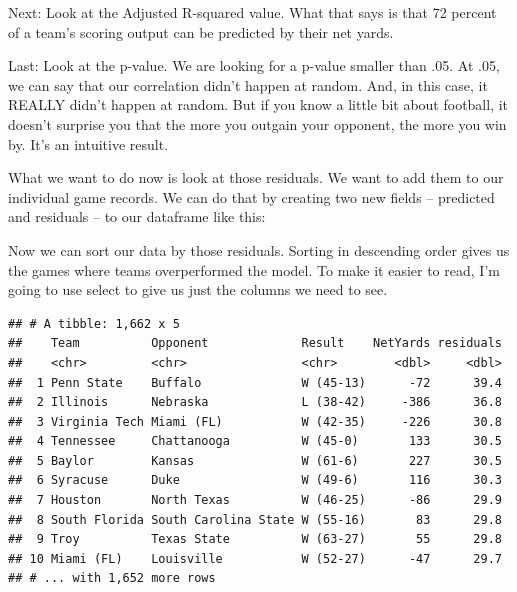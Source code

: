 \documentclass[
]{book}
\newenvironment{Shaded}{\begin{snugshade}}{\end{snugshade}}
\newcommand{\KeywordTok}[1]{\textcolor[rgb]{0.13,0.29,0.53}{\textbf{#1}}}
\newcommand{\NormalTok}[1]{#1}
\newcommand{\OperatorTok}[1]{\textcolor[rgb]{0.81,0.36,0.00}{\textbf{#1}}}
\newcommand{\StringTok}[1]{\textcolor[rgb]{0.31,0.60,0.02}{#1}}
\begin{document}
Next: Look at the Adjusted R-squared value. What that says is that 72 percent of a team's scoring output can be predicted by their net yards.

Last: Look at the p-value. We are looking for a p-value smaller than .05. At .05, we can say that our correlation didn't happen at random. And, in this case, it REALLY didn't happen at random. But if you know a little bit about football, it doesn't surprise you that the more you outgain your opponent, the more you win by. It's an intuitive result.

What we want to do now is look at those residuals. We want to add them to our individual game records. We can do that by creating two new fields -- predicted and residuals -- to our dataframe like this:

\begin{Shaded}
\end{Shaded}

Now we can sort our data by those residuals. Sorting in descending order gives us the games where teams overperformed the model. To make it easier to read, I'm going to use select to give us just the columns we need to see.

\begin{Shaded}
\end{Shaded}

\begin{verbatim}
## # A tibble: 1,662 x 5
##    Team          Opponent             Result    NetYards residuals
##    <chr>         <chr>                <chr>        <dbl>     <dbl>
##  1 Penn State    Buffalo              W (45-13)      -72      39.4
##  2 Illinois      Nebraska             L (38-42)     -386      36.8
##  3 Virginia Tech Miami (FL)           W (42-35)     -226      30.8
##  4 Tennessee     Chattanooga          W (45-0)       133      30.5
##  5 Baylor        Kansas               W (61-6)       227      30.5
##  6 Syracuse      Duke                 W (49-6)       116      30.3
##  7 Houston       North Texas          W (46-25)      -86      29.9
##  8 South Florida South Carolina State W (55-16)       83      29.8
##  9 Troy          Texas State          W (63-27)       55      29.8
## 10 Miami (FL)    Louisville           W (52-27)      -47      29.7
## # ... with 1,652 more rows
\end{verbatim}
\end{document}
